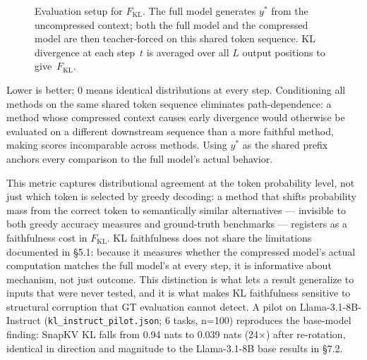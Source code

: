 \documentclass[10pt,letterpaper]{article}
\begin{document}
\begin{figure}[H]
\centering
{}
\caption{Evaluation setup for $F_{\text{KL}}$. The full model generates $y^*$ from the
uncompressed context; both the full model and the compressed model are then teacher-forced on
this shared token sequence. KL divergence at each step~$t$ is averaged over all $L$ output
positions to give~$F_{\text{KL}}$.}
\label{fig:eval-setup}
\end{figure}

Lower is better; 0 means identical distributions at every step.
Conditioning all methods on the same shared token sequence eliminates
path-dependence: a method whose compressed context causes early
divergence would otherwise be evaluated on a different downstream
sequence than a more faithful method, making scores incomparable across
methods. Using \(y^*\) as the shared prefix anchors every comparison to
the full model's actual behavior.

This metric captures distributional agreement at the token probability
level, not just which token is selected by greedy decoding: a method
that shifts probability mass from the correct token to semantically
similar alternatives --- invisible to both greedy accuracy measures and
ground-truth benchmarks --- registers as a faithfulness cost in
\(F_{\text{KL}}\). KL faithfulness does not share the limitations
documented in §5.1: because it measures whether the compressed model's
actual computation matches the full model's at every step, it is
informative about mechanism, not just outcome. This distinction is what
lets a result generalize to inputs that were never tested, and it is
what makes KL faithfulness sensitive to structural corruption that GT
evaluation cannot detect. A pilot on Llama-3.1-8B-Instruct
(\texttt{kl\_instruct\_pilot.json}; 6 tasks, n=100) reproduces the
base-model finding: SnapKV KL falls from 0.94 nats to 0.039 nats
(24×) after re-rotation, identical in direction and magnitude to the
Llama-3.1-8B base results in §7.2.
\end{document}
